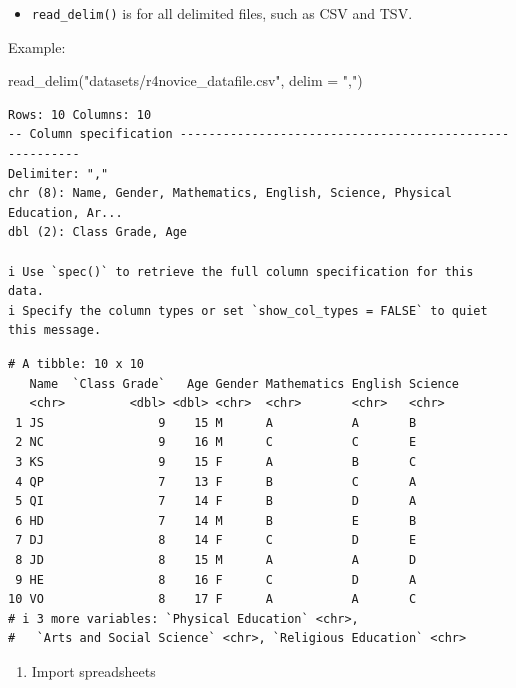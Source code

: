 \documentclass[
  letterpaper,
  DIV=11,
  numbers=noendperiod]{scrreprt}
\newenvironment{Shaded}{\begin{snugshade}}{\end{snugshade}}
\newcommand{\AttributeTok}[1]{\textcolor[rgb]{0.40,0.45,0.13}{#1}}
\newcommand{\FunctionTok}[1]{\textcolor[rgb]{0.28,0.35,0.67}{#1}}
\newcommand{\NormalTok}[1]{\textcolor[rgb]{0.00,0.23,0.31}{#1}}
\newcommand{\StringTok}[1]{\textcolor[rgb]{0.13,0.47,0.30}{#1}}
\providecommand{\tightlist}{%
  \setlength{\itemsep}{0pt}\setlength{\parskip}{0pt}}\usepackage{longtable,booktabs,array}
\begin{document}
\begin{itemize}
\tightlist
\item
  \texttt{read\_delim()} is for all delimited files, such as CSV and
  TSV.
\end{itemize}

Example:

\begin{Shaded}
\begin{Highlighting}[]
\FunctionTok{read\_delim}\NormalTok{(}\StringTok{"datasets/r4novice\_datafile.csv"}\NormalTok{, }\AttributeTok{delim =} \StringTok{","}\NormalTok{)}
\end{Highlighting}
\end{Shaded}

\begin{verbatim}
Rows: 10 Columns: 10
-- Column specification --------------------------------------------------------
Delimiter: ","
chr (8): Name, Gender, Mathematics, English, Science, Physical Education, Ar...
dbl (2): Class Grade, Age

i Use `spec()` to retrieve the full column specification for this data.
i Specify the column types or set `show_col_types = FALSE` to quiet this message.
\end{verbatim}

\begin{verbatim}
# A tibble: 10 x 10
   Name  `Class Grade`   Age Gender Mathematics English Science
   <chr>         <dbl> <dbl> <chr>  <chr>       <chr>   <chr>  
 1 JS                9    15 M      A           A       B      
 2 NC                9    16 M      C           C       E      
 3 KS                9    15 F      A           B       C      
 4 QP                7    13 F      B           C       A      
 5 QI                7    14 F      B           D       A      
 6 HD                7    14 M      B           E       B      
 7 DJ                8    14 F      C           D       E      
 8 JD                8    15 M      A           A       D      
 9 HE                8    16 F      C           D       A      
10 VO                8    17 F      A           A       C      
# i 3 more variables: `Physical Education` <chr>,
#   `Arts and Social Science` <chr>, `Religious Education` <chr>
\end{verbatim}

\begin{enumerate}
\def\labelenumi{\alph{enumi}.}
\setcounter{enumi}{1}
\tightlist
\item
  Import spreadsheets
\end{enumerate}
\end{document}
